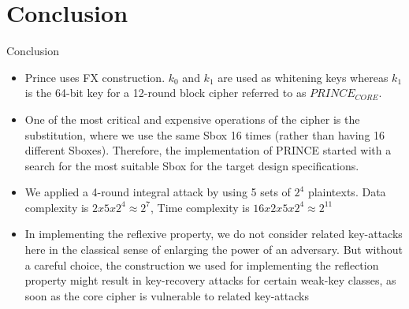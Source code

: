 \section{Conclusion}

\begin{frame}{Conclusion}
\begin{itemize}
    \item Prince uses FX construction. $k_{0}$ and $k_{1}$ are used as whitening keys whereas $k_{1}$ is the 64-bit
key for a 12-round block cipher referred to as $PRINCE_{CORE}$.
\item One of the most critical and expensive operations of the cipher is the substitution, where we use the same Sbox 16 times (rather than having 16 different Sboxes). Therefore, the implementation of PRINCE started with a search for the most suitable Sbox for the target design specifications.
\end{itemize}
\end{frame}
\begin{frame}
\begin{itemize}
\item We applied a 4-round integral attack by using 5 sets of $2^{4}$ plaintexts. Data complexity is $2x5x2^{4}≈2^{7}$, Time complexity is $16x2x5x2^{4}≈2^{11}$
\item In implementing the reflexive property, we do not consider related key-attacks here in the classical sense of enlarging the power of an adversary. But without a careful choice, the construction we used for implementing the reflection property might result in key-recovery attacks for certain weak-key classes, as soon as the core cipher is vulnerable to related key-attacks
\end{itemize}

\end{frame}

